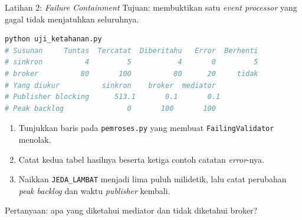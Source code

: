 \documentclass[aspectratio=169, table, 12pt]{beamer}
\begin{document}
\begin{frame}[fragile]{{\Large Latihan 2: \textit{Failure Containment}}}
  \vspace{2pt}
  {\small Tujuan: membuktikan satu \textit{event processor} yang gagal tidak menjatuhkan
  seluruhnya.}

  \vspace{2pt}
\begin{lstlisting}[language=bash, basicstyle=\ttfamily\tiny]
python uji_ketahanan.py
# Susunan     Tuntas  Tercatat  Diberitahu   Error  Berhenti
# sinkron          4         5           4       0         5
# broker          80       100          80      20     tidak
# Yang diukur          sinkron    broker  mediator
# Publisher blocking      513.1       0.1       0.1
# Peak backlog               0       100       100
\end{lstlisting}

  \vspace{2pt}
  \begin{enumerate}\small
    \item Tunjukkan baris pada \texttt{pemroses.py} yang membuat
          \texttt{FailingValidator} menolak.
    \item Catat kedua tabel hasilnya beserta ketiga contoh catatan
          \textit{error}-nya.
    \item Naikkan \texttt{JEDA\_LAMBAT} menjadi lima puluh milidetik, lalu catat
          perubahan \textit{peak backlog} dan waktu \textit{publisher} kembali.
  \end{enumerate}

  \vspace{2pt}
  {\small Pertanyaan: apa yang diketahui mediator dan tidak diketahui broker?}
\end{frame}
\end{document}
